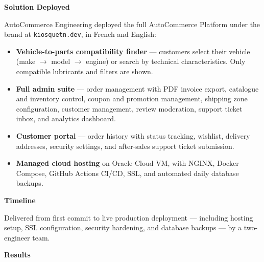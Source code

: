 \documentclass[11pt,a4paper]{article}
\begin{document}
\medskip
\noindent\textbf{Solution Deployed}

AutoCommerce Engineering deployed the full AutoCommerce Platform under
the brand at \texttt{kiosquetn.dev}, in French and English:

\begin{itemize}[leftmargin=1.4em,itemsep=3pt]
  \item \textbf{Vehicle-to-parts compatibility finder} --- customers
        select their vehicle (make $\rightarrow$ model $\rightarrow$
        engine) or search by technical characteristics. Only
        compatible lubricants and filters are shown.
  \item \textbf{Full admin suite} --- order management with PDF
        invoice export, catalogue and inventory control, coupon and
        promotion management, shipping zone configuration, customer
        management, review moderation, support ticket inbox, and
        analytics dashboard.
  \item \textbf{Customer portal} --- order history with status
        tracking, wishlist, delivery addresses, security settings,
        and after-sales support ticket submission.
  \item \textbf{Managed cloud hosting} on Oracle Cloud VM, with
        NGINX, Docker Compose, GitHub Actions CI/CD, SSL, and
        automated daily database backups.
\end{itemize}

\medskip
\noindent\textbf{Timeline}

Delivered from first commit to live production deployment ---
including hosting setup, SSL configuration, security hardening,
and database backups --- by a two-engineer team.

\medskip
\newpage
\noindent\textbf{Results}
\end{document}
